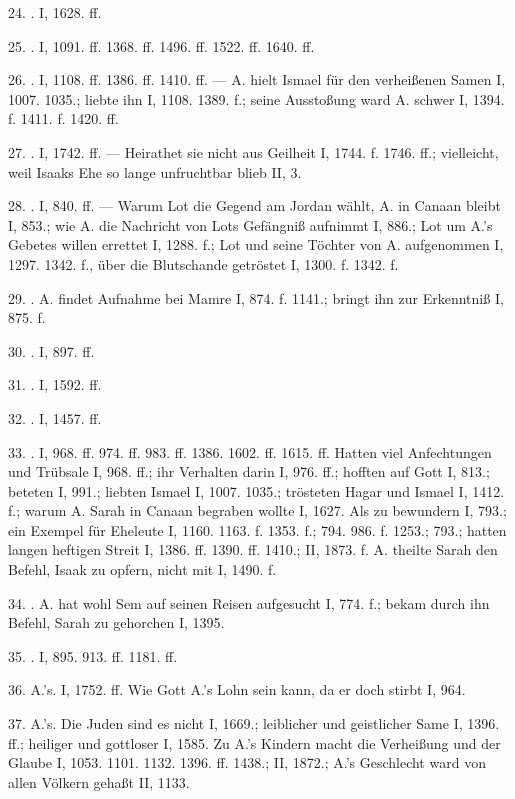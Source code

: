24. . I, 1628. ff.

25. . I, 1091. ff. 1368. ff. 1496. ff. 1522. ff. 1640. ff.

26. . I, 1108. ff. 1386. ff. 1410. ff. — A. hielt Ismael für den verheißenen Samen I, 1007. 1035.; liebte ihn I, 1108. 1389. f.; seine Ausstoßung ward A. schwer I, 1394. f. 1411. f. 1420. ff.

27. . I, 1742. ff. — Heirathet sie nicht aus Geilheit I, 1744. f. 1746. ff.; vielleicht, weil Isaaks Ehe so lange unfruchtbar blieb II, 3.

28. . I, 840. ff. — Warum Lot die Gegend am Jordan wählt, A. in Canaan bleibt I, 853.; wie A. die Nachricht von Lots Gefängniß aufnimmt I, 886.; Lot um A.’s Gebetes willen errettet I, 1288. f.; Lot und seine Töchter von A. aufgenommen I, 1297. 1342. f., über die Blutschande getröstet I, 1300. f. 1342. f.

29. . A. findet Aufnahme bei Mamre I, 874. f. 1141.; bringt ihn zur Erkenntniß I, 875. f.

30. . I, 897. ff.

31. . I, 1592. ff.

32. . I, 1457. ff.

33. . I, 968. ff. 974. ff. 983. ff. 1386. 1602. ff. 1615. ff. Hatten viel Anfechtungen und Trübsale I, 968. ff.; ihr Verhalten darin I, 976. ff.; hofften auf Gott I, 813.; beteten I, 991.; liebten Ismael I, 1007. 1035.; trösteten Hagar und Ismael I, 1412. f.; warum A. Sarah in Canaan begraben wollte I, 1627. Als  zu bewundern I, 793.; ein Exempel für Eheleute I, 1160. 1163. f. 1353. f.; 794. 986. f. 1253.; 793.; hatten langen heftigen Streit I, 1386. ff. 1390. ff. 1410.; II, 1873. f. A. theilte Sarah den Befehl, Isaak zu opfern, nicht mit I, 1490. f.

34. . A. hat wohl Sem auf seinen Reisen aufgesucht I, 774. f.; bekam durch ihn Befehl, Sarah zu gehorchen I, 1395.

35. . I, 895. 913. ff. 1181. ff.

36.  A.’s. I, 1752. ff. Wie Gott A.’s Lohn sein kann, da er doch stirbt I, 964.

37.  A.’s. Die Juden sind es nicht I, 1669.; leiblicher und geistlicher Same I, 1396. ff.; heiliger und gottloser I, 1585. Zu A.’s Kindern macht die Verheißung und der Glaube I, 1053. 1101. 1132. 1396. ff. 1438.; II, 1872.; A.’s Geschlecht ward von allen Völkern gehaßt II, 1133.

